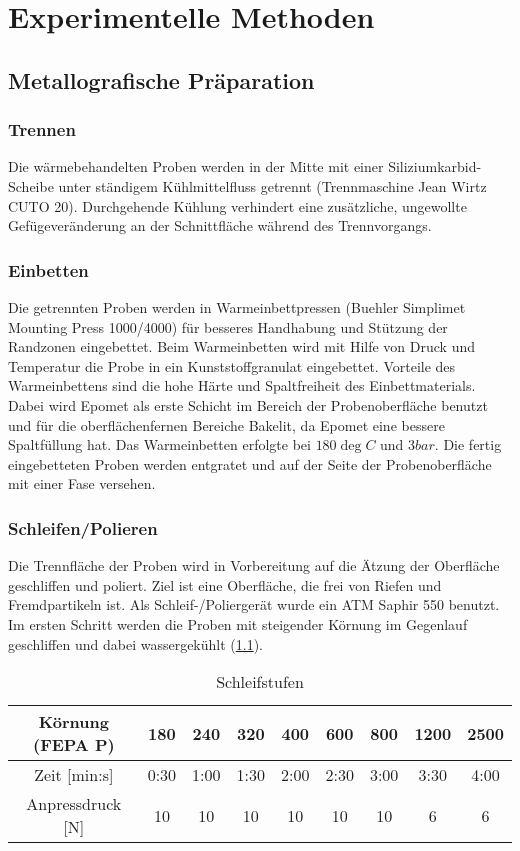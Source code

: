 \chapter{Experimentelle Methoden}

\section {Metallografische Präparation}

\subsection{Trennen}
Die wärmebehandelten Proben werden in der Mitte mit einer Siliziumkarbid-Scheibe unter ständigem Kühlmittelfluss getrennt (Trennmaschine Jean Wirtz CUTO 20). Durchgehende Kühlung  verhindert eine zusätzliche, ungewollte Gefügeveränderung an der Schnittfläche während des Trennvorgangs.


\subsection{Einbetten}
Die getrennten Proben werden in Warmeinbettpressen (Buehler Simplimet Mounting Press 1000/4000) für besseres Handhabung und Stützung der Randzonen eingebettet. Beim Warmeinbetten wird mit Hilfe von Druck und Temperatur die Probe in ein Kunststoffgranulat eingebettet. Vorteile des Warmeinbettens sind die hohe Härte und Spaltfreiheit des Einbettmaterials. Dabei wird Epomet als erste Schicht im Bereich der Probenoberfläche benutzt und für die oberflächenfernen Bereiche Bakelit, da Epomet eine bessere Spaltfüllung hat. Das Warmeinbetten erfolgte bei $180 \deg C$ und $3 bar$. 
Die fertig eingebetteten Proben werden entgratet und auf der Seite der Probenoberfläche mit einer Fase versehen.  


\subsection{Schleifen/Polieren}

Die Trennfläche der Proben wird in Vorbereitung auf die Ätzung der Oberfläche geschliffen und poliert. Ziel ist eine Oberfläche, die frei von Riefen und Fremdpartikeln ist. Als Schleif-/Poliergerät wurde ein ATM Saphir 550 benutzt.
Im ersten Schritt werden die Proben mit steigender Körnung im Gegenlauf geschliffen und dabei wassergekühlt (\ref{tab:Schleifstufen}). 

\begin{table}[h]
	\centering
	\begin{tabular}{|c|c|c|c|c|c|c|c|c|}
		
		\hline 
		Körnung (FEPA P) & 180 & 240 & 320 & 400 & 600 & 800 & 1200 & 2500 \\ 
		\hline 
		Zeit [min:s] & 0:30 & 1:00 & 1:30 & 2:00 & 2:30 & 3:00 & 3:30 & 4:00 \\ 
		\hline 
		Anpressdruck [N] & 10&10&10&10&10&10&6&6\\
		\hline
	\end{tabular} 
		\caption{Schleifstufen}
		\label{tab:Schleifstufen}
\end{table}


